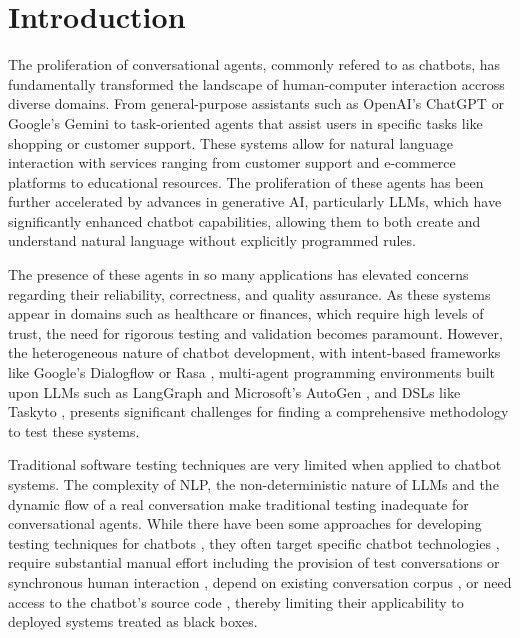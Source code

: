 
\chapter{Introduction}\label{chapter:introduction}


The proliferation of conversational agents, commonly refered to as chatbots, has fundamentally transformed the landscape of human-computer interaction accross diverse domains.
From general-purpose assistants such as OpenAI's ChatGPT \autocite{ChatGPT} or Google's Gemini \autocite{GoogleGemini}
to task-oriented agents that assist users in specific tasks like shopping or customer support.
These systems allow for natural language interaction with services ranging from customer support and e-commerce platforms to educational resources.
The proliferation of these agents has been further accelerated by advances in generative \ac{AI},
particularly \acp{LLM},
which have significantly enhanced chatbot capabilities, allowing them to both create and understand natural language without explicitly programmed rules.

The presence of these agents in so many applications has elevated concerns regarding their reliability, correctness, and quality assurance.
As these systems appear in domains such as healthcare or finances, which require high levels of trust, the need for rigorous testing and validation becomes paramount.
However, the heterogeneous nature of chatbot development,
with intent-based frameworks like Google's Dialogflow \autocite{Dialogflow} or Rasa \autocite{Rasa2020},
multi-agent programming environments built upon LLMs such as LangGraph \autocite{LangGraph} and Microsoft's AutoGen \autocite{AutoGen},
and \acp{DSL} like Taskyto \autocite{sanchezcuadradoAutomatingDevelopmentTaskoriented2024},
presents significant challenges for finding a comprehensive methodology to test these systems.

Traditional software testing techniques are very limited when applied to chatbot systems.
The complexity of \ac{NLP}, the non-deterministic nature of \acp{LLM} and the dynamic flow of a real conversation make traditional testing inadequate for conversational agents.
While there have been some approaches for developing testing techniques for chatbots \cite{cuadradoIntegratingStaticQuality2024, canizaresMeasuringClusteringHeterogeneous2024},
they often target specific chatbot technologies \autocite{RasaTest2025},
require substantial manual effort including the provision of test conversations \autocite{CyaraBotium, RasaTest2025}
or synchronous human interaction \autocite{renEvaluationTechniquesChatbot2019},
depend on existing conversation corpus \autocite{vasconcelosBottesterTestingConversational2017},
or need access to the chatbot's source code \autocite{canizaresCoveragebasedStrategiesAutomated2024, gomez-abajoMutationTestingTaskOriented2024, urricoMutaBotMutationTesting2024},
thereby limiting their applicability to deployed systems treated as black boxes.


